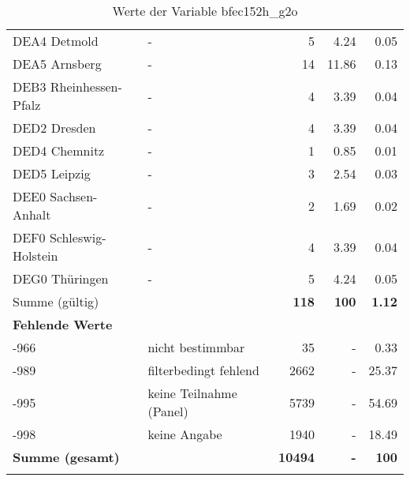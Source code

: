 \begin{longtable}{Xlrrr}
        \multicolumn{1}{X}{DEA4 Detmold} & - & \num{5} & \num[round-mode=places,round-precision=2]{4.24} & \num[round-mode=places,round-precision=2]{0.05} \\
        \multicolumn{1}{X}{DEA5 Arnsberg} & - & \num{14} & \num[round-mode=places,round-precision=2]{11.86} & \num[round-mode=places,round-precision=2]{0.13} \\
        \multicolumn{1}{X}{DEB3 Rheinhessen-Pfalz} & - & \num{4} & \num[round-mode=places,round-precision=2]{3.39} & \num[round-mode=places,round-precision=2]{0.04} \\
        \multicolumn{1}{X}{DED2 Dresden} & - & \num{4} & \num[round-mode=places,round-precision=2]{3.39} & \num[round-mode=places,round-precision=2]{0.04} \\
        \multicolumn{1}{X}{DED4 Chemnitz} & - & \num{1} & \num[round-mode=places,round-precision=2]{0.85} & \num[round-mode=places,round-precision=2]{0.01} \\
        \multicolumn{1}{X}{DED5 Leipzig} & - & \num{3} & \num[round-mode=places,round-precision=2]{2.54} & \num[round-mode=places,round-precision=2]{0.03} \\
        \multicolumn{1}{X}{DEE0 Sachsen-Anhalt} & - & \num{2} & \num[round-mode=places,round-precision=2]{1.69} & \num[round-mode=places,round-precision=2]{0.02} \\
        \multicolumn{1}{X}{DEF0 Schleswig-Holstein} & - & \num{4} & \num[round-mode=places,round-precision=2]{3.39} & \num[round-mode=places,round-precision=2]{0.04} \\
        \multicolumn{1}{X}{DEG0 Thüringen} & - & \num{5} & \num[round-mode=places,round-precision=2]{4.24} & \num[round-mode=places,round-precision=2]{0.05} \\
     \midrule
      \multicolumn{2}{l}{Summe (gültig)} & \textbf{\num{118}} &
      \textbf{\num{100}} &
         \textbf{\num[round-mode=places,round-precision=2]{1.12}} \\
     \multicolumn{5}{l}{\textbf{Fehlende Werte}}\\
       -966 & nicht bestimmbar & \num{35} & - & \num[round-mode=places,round-precision=2]{0.33} \\

       -989 & filterbedingt fehlend & \num{2662} & - & \num[round-mode=places,round-precision=2]{25.37} \\

       -995 & keine Teilnahme (Panel) & \num{5739} & - & \num[round-mode=places,round-precision=2]{54.69} \\

       -998 & keine Angabe & \num{1940} & - & \num[round-mode=places,round-precision=2]{18.49} \\

     \midrule
     \multicolumn{2}{l}{\textbf{Summe (gesamt)}} & \textbf{\num{10494}} & \textbf{-} & \textbf{\num{100}} \\
     \bottomrule
     \caption{Werte der Variable bfec152h\_g2o}
     \end{longtable}
     
